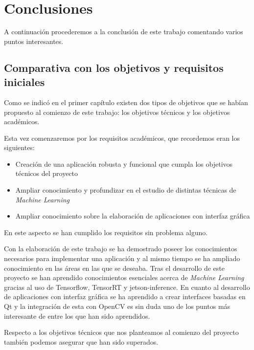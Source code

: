 \chapter{Conclusiones}\label{capConclusiones}
A continuación procederemos a la conclusión de este trabajo comentando varios puntos interesantes.

\section{Comparativa con los objetivos y requisitos iniciales}
Como se indicó en el primer capítulo existen dos tipos de objetivos que se habían propuesto al comienzo de este trabajo: los objetivos técnicos y los objetivos académicos.

Esta vez comenzaremos por los requisitos académicos, que recordemos eran los siguientes:

\begin{itemize}
    \item Creación de una aplicación robusta y funcional que cumpla los objetivos técnicos del proyecto
    \item Ampliar conocimiento y profundizar en el estudio de distintas técnicas de \textit{Machine Learning}
    \item Ampliar conocimiento sobre la elaboración de aplicaciones con interfaz gráfica
\end{itemize}

En este aspecto se han cumplido los requisitos sin problema alguno.

Con la elaboración de este trabajo se ha demostrado poseer los conocimientos necesarios para implementar una aplicación y al mismo tiempo se ha ampliado conocimiento en las áreas en las que se deseaba. Tras el desarrollo de este proyecto se han aprendido conocimientos esenciales acerca de \textit{Machine Learning} gracias al uso de Tensorflow, TensorRT y jetson-inference. En cuanto al desarrollo de aplicaciones con interfaz gráfica se ha aprendido a crear interfaces basadas en Qt y la integración de esta con OpenCV es sin duda uno de los puntos más interesante de entre los que han sido aprendidos.


Respecto a los objetivos técnicos que nos planteamos al comienzo del proyecto también podemos asegurar que han sido superados.

